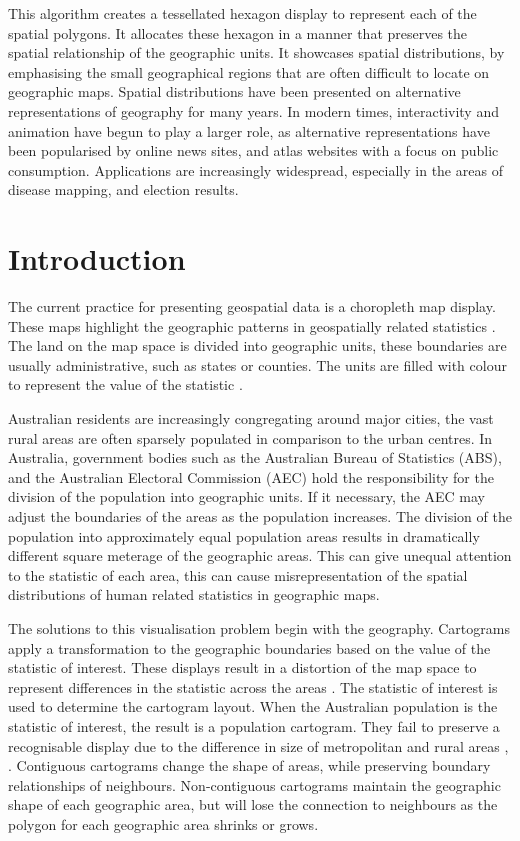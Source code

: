 \documentclass{monashthesis}
\begin{document}
This algorithm creates a tessellated hexagon display to represent each of the spatial polygons. It allocates these hexagon in a manner that preserves the spatial relationship of the geographic units. It showcases spatial distributions, by emphasising the small geographical regions that are often difficult to locate on geographic maps. Spatial distributions have been presented on alternative representations of geography for many years. In modern times, interactivity and animation have begun to play a larger role, as alternative representations have been popularised by online news sites, and atlas websites with a focus on public consumption. Applications are increasingly widespread, especially in the areas of disease mapping, and election results.

\hypertarget{introduction-1}{%
\section{Introduction}\label{introduction-1}}

The current practice for presenting geospatial data is a choropleth map display. These maps highlight the geographic patterns in geospatially related statistics \autocite{SAMGIS}.
The land on the map space is divided into geographic units, these boundaries are usually administrative, such as states or counties. The units are filled with colour to represent the value of the statistic \autocite{EI}.

Australian residents are increasingly congregating around major cities, the vast rural areas are often sparsely populated in comparison to the urban centres.
In Australia, government bodies such as the Australian Bureau of Statistics (ABS), and the Australian Electoral Commission (AEC) hold the responsibility for the division of the population into geographic units. If it necessary, the AEC may adjust the boundaries of the areas as the population increases. The division of the population into approximately equal population areas results in dramatically different square meterage of the geographic areas. This can give unequal attention to the statistic of each area, this can cause misrepresentation of the spatial distributions of human related statistics in geographic maps.

The solutions to this visualisation problem begin with the geography. Cartograms apply a transformation to the geographic boundaries based on the value of the statistic of interest. These displays result in a distortion of the map space to represent differences in the statistic across the areas \autocite{ACCAC}.
The statistic of interest is used to determine the cartogram layout. When the
Australian population is the statistic of interest, the result is a population cartogram. They fail to preserve a recognisable display due to the difference in size of metropolitan and rural areas \autocite{ACTUC}, \autocite{GOINO}.
Contiguous cartograms change the shape of areas, while preserving boundary relationships of neighbours. Non-contiguous cartograms maintain the geographic shape of each geographic area, but will lose the connection to neighbours as the polygon for each geographic area shrinks or grows.
\end{document}
